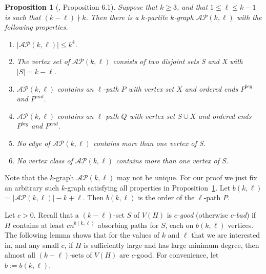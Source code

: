 \documentclass[11pt, reqno]{amsart}    	%
\newtheorem{prop}[thm]{Proposition}
\theoremstyle{definition}
\numberwithin{equation}{section}
\begin{document}
\begin{appendix}
		\begin{prop}[\cite{Daniela2010Hamilton}, Proposition 6.1]\label{Prop1} 
			Suppose that $k\ge3$, and that $1\leq \ell \leq k-1$ is such that $(k-\ell)\nmid k$. Then there is a $k$-partite $k$-graph $\mathcal{AP}(k,\ell)$ with the following properties.
			\begin{enumerate}
				\item $|\mathcal{AP}(k,\ell)|\le k^{4}$.
				\item The vertex set of $\mathcal{AP}(k,\ell)$ consists of two disjoint sets S and X with $|S| = k-\ell $.
				\item $\mathcal{AP}(k,\ell)$ contains an $ \ell $-path $P$ with vertex set 
				$X$ and ordered ends $ P^{beg} $ and $ P^{end} $.
				\item \label{prop1_4}$\mathcal{AP}(k,\ell)$ contains an $ \ell $-path $Q$ with vertex set $S\cup X$ and ordered ends $ P^{beg} $ and $ P^{end} $.
				\item \label{prop1_5}No edge of $\mathcal{AP}(k,\ell)$ contains more than one vertex of S.
				\item No vertex class of $\mathcal{AP}(k,\ell)$ contains more than one vertex of S.
			\end{enumerate}
		\end{prop}
		Note that the $k$-graph $\mathcal{AP}(k,\ell)$ may not be unique. 
		For our proof we just fix an arbitrary such $k$-graph satisfying all properties in Proposition~\ref{Prop1}.
		Let $b(k,\ell)$= $|\mathcal{AP}(k,\ell)|-k+\ell$. Then $b(k,\ell)$ is the order of the $ \ell $-path $P$.
		
		Let $c>0$. Recall that a $( k-\ell) $-set $S$ of $V(H)$ is \emph{$c$-good} (otherwise \emph{$c$-bad}) if $H$ contains at least $cn^{b(k,\ell)}$ absorbing paths for $S$, each on  $b(k,\ell)$ vertices. The following lemma shows that for the values of $k$ and $\ell$ that we are interested in, and any small $c$, if $H$ is sufficiently large and has large minimum degree, then almost all $( k-\ell) $-sets of $ V(H) $ are $c$-good. For convenience, let $b:=b(k,\ell)$.
		

\end{appendix}
\end{document}
